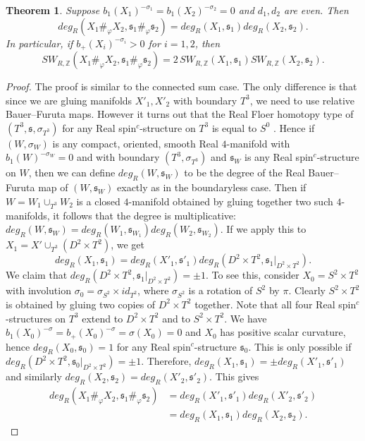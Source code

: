 \documentclass{amsart}
\newtheorem{theorem}{Theorem}[section]
\theoremstyle{definition}
\theoremstyle{remark}
\numberwithin{equation}{section}
\begin{document}
\begin{theorem}\label{thm:fsum}
Suppose $b_1(X_1)^{-\sigma_1} = b_1(X_2)^{-\sigma_2} = 0$ and $d_1, d_2$ are even. Then
\[
deg_R(X_1 \#_\varphi X_2 , \mathfrak{s}_1 \#_\varphi \mathfrak{s}_2) = deg_R(X_1 ,\mathfrak{s}_1) deg_R(X_2 , \mathfrak{s}_2).
\]
In particular, if $b_+(X_i)^{-\sigma_i} > 0$ for $i=1,2$, then
\[
SW_{R,\mathbb{Z}}( X_1 \#_\varphi X_2 , \mathfrak{s}_1 \#_\varphi \mathfrak{s}_2 ) = 2 \, SW_{R,\mathbb{Z}}(X_1 , \mathfrak{s}_1) SW_{R,\mathbb{Z}}(X_2 ,\mathfrak{s}_2).
\]
\end{theorem}
\begin{proof}
The proof is similar to the connected sum case. The only difference is that since we are gluing manifolds $X'_1,X'_2$ with boundary $T^3$, we need to use relative Bauer--Furuta maps. However it turns out that the Real Floer homotopy type of $(T^3 , \mathfrak{s} , \sigma_{T^3})$ for any Real spin$^c$-structure on $T^3$ is equal to $S^0$ \cite[Proposition 4.24]{mi}. Hence if $(W , \sigma_W)$ is any compact, oriented, smooth Real $4$-manifold with $b_1(W)^{-\sigma_W} = 0$ and with boundary $(T^3 , \sigma_{T^3})$ and $\mathfrak{s}_W$ is any Real spin$^c$-structure on $W$, then we can define $deg_R(W , \mathfrak{s}_W)$ to be the degree of the Real Bauer--Furuta map of $(W , \mathfrak{s}_W)$ exactly as in the boundaryless case. Then if $W = W_1 \cup_{T^3} W_2$ is a closed $4$-manifold obtained by gluing together two such $4$-manifolds, it follows that the degree is multiplicative: $deg_R(W , \mathfrak{s}_W ) = deg_R(W_1 , \mathfrak{s}_{W_1}) deg_R(W_2 , \mathfrak{s}_{W_2})$. If we apply this to $X_1 = X' \cup_{T^3} (D^2 \times T^2)$, we get
\[
deg_R(X_1 , \mathfrak{s}_1) = deg_R(X'_1 , \mathfrak{s}'_1) deg_R( D^2 \times T^2 , \mathfrak{s}_1 |_{D^2 \times T^2}).
\]
We claim that $deg_R( D^2 \times T^2 , \mathfrak{s}_1 |_{D^2 \times T^2}) = \pm 1$. To see this, consider $X_0 = S^2 \times T^2$ with involution $\sigma_0 = \sigma_{S^2} \times id_{T^2}$, where $\sigma_{S^2}$ is a rotation of $S^2$ by $\pi$. Clearly $S^2 \times T^2$ is obtained by gluing two copies of $D^2 \times T^2$ together. Note that all four Real spin$^c$-structures on $T^3$ extend to $D^2 \times T^2$ and to $S^2 \times T^2$. We have $b_1(X_0)^{-\sigma} = b_+(X_0)^{-\sigma} = \sigma(X_0) = 0$ and $X_0$ has positive scalar curvature, hence $deg_R( X_0 , \mathfrak{s}_0) = 1$ for any Real spin$^c$-structure $\mathfrak{s}_0$. This is only possible if $deg_R(D^2 \times T^2 , \mathfrak{s}_0 |_{D^2 \times T^2} ) = \pm 1$. Therefore, $deg_R(X_1 , \mathfrak{s}_1) = \pm deg_R(X'_1 , \mathfrak{s}'_1)$ and similarly $deg_R(X_2 , \mathfrak{s}_2) = deg_R(X'_2 , \mathfrak{s}'_2)$. This gives
\begin{align*}
deg_R( X_1 \#_\varphi X_2 , \mathfrak{s}_1 \#_\varphi \mathfrak{s}_2 ) &= deg_R(X'_1 , \mathfrak{s}'_1) deg_R(X'_2 , \mathfrak{s}'_2) \\
&= deg_R(X_1 , \mathfrak{s}_1) deg_R(X_2 , \mathfrak{s}_2).
\end{align*}

\end{proof}
\end{document}
